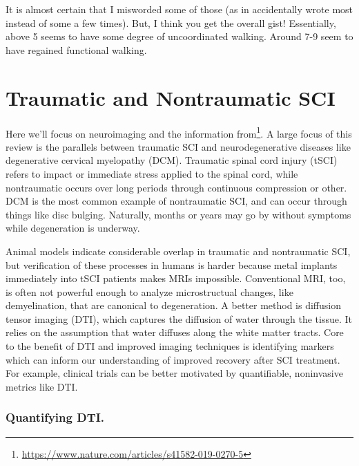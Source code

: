 \documentclass[12pt]{report}
\begin{document}
It is almost certain that I misworded some of those (as in accidentally wrote most instead of some a few times). But, I think you get the overall gist! Essentially, above 5 seems to have some degree of uncoordinated walking. Around 7-9 seem to have regained functional walking. 


\section{Traumatic and Nontraumatic SCI}

\label{sec:TvsnonTSCI}

Here we'll focus on neuroimaging and the information from\footnote{\url{https://www.nature.com/articles/s41582-019-0270-5}}. A large focus of this review is the parallels between traumatic SCI and neurodegenerative diseases like degenerative cervical myelopathy (DCM). Traumatic spinal cord injury (tSCI) refers to impact or immediate stress applied to the spinal cord, while nontraumatic occurs over long periods through continuous compression or other. DCM is the most common example of nontraumatic SCI, and can occur through things like disc bulging. Naturally, months or years may go by without symptoms while degeneration is underway.\newline

Animal models indicate considerable overlap in traumatic and nontraumatic SCI, but verification of these processes in humans is harder because metal implants immediately into tSCI patients makes MRIs impossible. Conventional MRI, too, is often not powerful enough to analyze microstructual changes, like demyelination, that are canonical to degeneration. A better method is diffusion tensor imaging (DTI), which captures the diffusion of water through the tissue. It relies on the assumption that water diffuses along the white matter tracts. Core to the benefit of DTI and improved imaging techniques is identifying markers which can inform our understanding of improved recovery after SCI treatment. For example, clinical trials can be better motivated by quantifiable, noninvasive metrics like DTI. 

\subsubsection{Quantifying DTI.}
\end{document}
